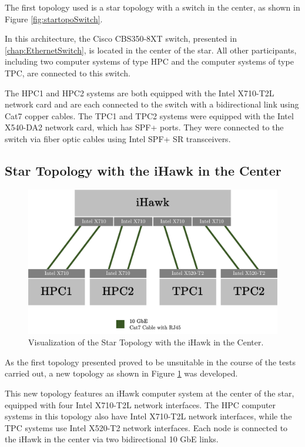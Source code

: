 The first topology used is a star topology with a switch in the center, as shown in Figure \ref{fig:startopoSwitch}.

In this architecture, the Cisco CBS350-8XT switch, presented in \ref{chap:EthernetSwitch}, is located in the center of the star. All other participants, including two computer systems of type HPC and the computer systems of type TPC, are connected to this switch.

The HPC1 and HPC2 systems are both equipped with the Intel X710-T2L network card and are each connected to the switch with a bidirectional link using Cat7 copper cables. The TPC1 and TPC2 systems were equipped with the Intel X540-DA2 network card, which has SPF+ ports. They were connected to the switch via fiber optic cables using Intel SPF+ SR transceivers.

\subsection{Star Topology with the iHawk in the Center}

\begin{figure}[h!]
    \centering
    \includegraphics[width=1\linewidth]{figures/method/topo3.png}
    \caption[Visualization of the Star Topology with the iHawk in the Center]{Visualization of the Star Topology with the iHawk in the Center.}
    \label{fig:startopoIHawk}
\end{figure}

As the first topology presented proved to be unsuitable in the course of the tests carried out, a new topology as shown in Figure \ref{fig:startopoIHawk} was developed.

This new topology features an iHawk computer system at the center of the star, equipped with four Intel X710-T2L network interfaces. The HPC computer systems in this topology also have Intel X710-T2L network interfaces, while the TPC systems use Intel X520-T2 network interfaces. Each node is connected to the iHawk in the center via two bidirectional 10 GbE links.


